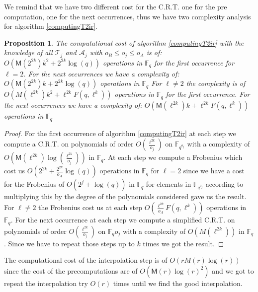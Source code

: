 \documentclass{lms}
\newtheorem{prop}[thm]{Proposition}
\begin{document}
We remind that we have two different cost for the C.R.T. one for the pre computation, one for the next occurrences, thus we have two complexity analysis for algorithm \ref{computingT2ir}.

\begin{prop} %
The computational cost of algorithm \ref{computingT2ir} with the knowledge of all $\mathcal{T}_j$ and $\mathcal{A}_j$ with $  o_B \leqslant o_j \leqslant o_A$  is of:
$O(\mathsf{M}(2^{2k})k^2+ 2^{2k}\log(q))
$
operations in $\mathbb{F}_q$ for the first occurrence for $\ell=2$. For the next occurrences we have a complexity of:
$
O(\mathsf{M}(2^{2k})k+2^{2k}\log(q))
$
operations in $\mathbb{F}_q$
\newline For $\ell \neq 2$ the complexity is of $
O(M(\ell^{2k})k^2+ \ell^{2k}F(q,\ell^k))
$
operations in $\mathbb{F}_q$ for the first occurrence. For the next occurrences we have a complexity of:
$
O(\mathsf{M}(\ell^{2k})k+\ell^{2k}F(q,\ell^k))
$
operations in $\mathbb{F}_q$

\end{prop}

\begin{proof}
For the first occurrence of algorithm \ref{computingT2ir} at each step we compute a C.R.T. on polynomials of order $O(\frac{\ell^{2k}}{o_j})$ on $\mathbb{F}_{q^{o_j}}$ with a complexity of $O(\mathsf{M}(\ell^{2k})\log(\frac{\ell^{2k}}{o_j}))$ in $\mathbb{F}_q$. At each step we compute a Frobenius which cost us $O(2^{2k}+\frac{2^{2k}}{o_A}\log(q))$ operations in $\mathbb{F}_q$ for $\ell=2$ since we have a cost for the Frobenius of $O(2^j+\log(q))$ in $\mathbb{F}_{q}$ for elements in $\mathbb{F}_{q^{o_{j}}}$ according to \cite{DoSc12} multiplying this by the degree of the polynomials considered gave us the result. For $\ell \neq 2$ the Frobenius cost us at each step $O(\frac{\ell^{2k}}{o_A}F(q,\ell^k))$ operations in $\mathbb{F}_q$.
 For the next occurrence at each step we compute a simplified C.R.T. on polynomials of order $O(\frac{\ell^{2k}}{o_j})$ on $\mathbb{F}_q{o_j}$ with a complexity of $O(M(\ell^{2k}))$ in $\mathbb{F}_q$.
Since we have to repeat those steps up to $k$ times we got the result.
\end{proof}


The computational cost of the interpolation step is of $O(rM(r)\log(r))$ since the cost of the precomputations are of $O(\mathsf{M}(r)\log(r)^2)$ and we got to repeat the interpolation try $O(r)$ times until we find the good interpolation.
\end{document}
